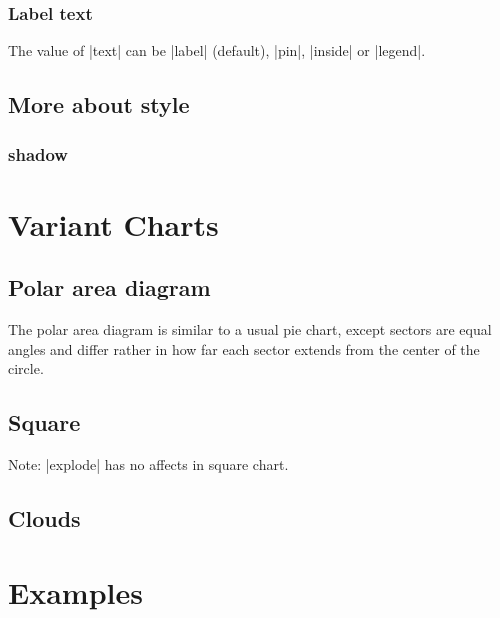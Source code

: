 \documentclass{ltxdoc}
\begin{document}
\subsubsection{Label text}
The value of |text| can be |label| (default),
|pin|, |inside| or |legend|.

\codeexample[scale=0.25,from file={demo/text.tex}]

\codeexample[scale=0.25,from file={demo/text-inside.tex}]

\codeexample[scale=0.25,from file={demo/legend.tex}]

\subsection{More about style}
\subsubsection{shadow}
\codeexample[scale=0.25,from file={demo/shadow.tex}]

\section{Variant Charts}
\subsection{Polar area diagram}
The polar area diagram is similar to a usual pie chart, except sectors
are equal angles and differ rather in how far each sector extends from
the center of the circle.

\codeexample[scale=0.25,from file={demo/polar.tex}]

\subsection{Square}

\codeexample[scale=0.25,from file={demo/square.tex}]

Note: |explode| has no affects in square chart.

\subsection{Clouds}

\codeexample[scale=0.25,from file={demo/cloud.tex}]

\section{Examples}
\end{document}
